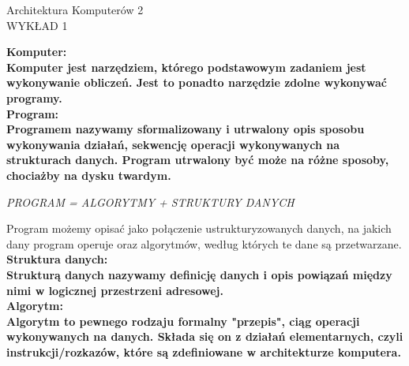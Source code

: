 \documentclass[a4paper,12pt]{article}
\newcommand{\h}[1]{\noindent \bf #1 \rm \\ \noindent}
\begin{document}
\begin{center}
	\LARGE
	Architektura Komputerów 2 \\
	\large
	WYKŁAD 1 
\end{center}
\vspace{1cm}
	
\h{Komputer:}
Komputer jest narzędziem, którego podstawowym zadaniem jest wykonywanie obliczeń. Jest to ponadto narzędzie zdolne wykonywać programy.\\

\h{Program:}
Programem nazywamy sformalizowany i utrwalony opis sposobu wykonywania działań, sekwencję operacji wykonywanych na strukturach danych. Program utrwalony być może na różne sposoby, chociażby na dysku twardym. \\

\begin{center}
	\it
	PROGRAM = ALGORYTMY + STRUKTURY DANYCH
\end{center}

\noindent
Program możemy opisać jako połączenie ustrukturyzowanych danych, na jakich dany program operuje oraz algorytmów, według których te dane są przetwarzane. \\

\h{Struktura danych:}
Strukturą danych nazywamy definicję danych i opis powiązań między nimi w logicznej przestrzeni adresowej. \\

\h{Algorytm:}
Algorytm to pewnego rodzaju formalny "przepis", ciąg operacji wykonywanych na danych. Składa się on z działań elementarnych, czyli instrukcji/rozkazów, które są zdefiniowane w architekturze komputera. \\
\end{document}
